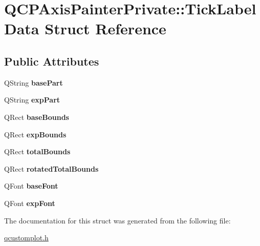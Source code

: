 \hypertarget{structQCPAxisPainterPrivate_1_1TickLabelData}{}\section{Q\+C\+P\+Axis\+Painter\+Private\+:\+:Tick\+Label\+Data Struct Reference}
\label{structQCPAxisPainterPrivate_1_1TickLabelData}
\subsection*{Public Attributes}
\begin{DoxyCompactItemize}
\item 
Q\+String {\bfseries base\+Part}\hypertarget{structQCPAxisPainterPrivate_1_1TickLabelData_ad65b76a5cafc412179a20b5d79809fc4}{}\label{structQCPAxisPainterPrivate_1_1TickLabelData_ad65b76a5cafc412179a20b5d79809fc4}

\item 
Q\+String {\bfseries exp\+Part}\hypertarget{structQCPAxisPainterPrivate_1_1TickLabelData_a09692e4ea092137278b4ac051d5fdf2b}{}\label{structQCPAxisPainterPrivate_1_1TickLabelData_a09692e4ea092137278b4ac051d5fdf2b}

\item 
Q\+Rect {\bfseries base\+Bounds}\hypertarget{structQCPAxisPainterPrivate_1_1TickLabelData_aac1047ae6ab8e9f5a42923082aabfff5}{}\label{structQCPAxisPainterPrivate_1_1TickLabelData_aac1047ae6ab8e9f5a42923082aabfff5}

\item 
Q\+Rect {\bfseries exp\+Bounds}\hypertarget{structQCPAxisPainterPrivate_1_1TickLabelData_a6722d2bcefb93011e9dc42301b966846}{}\label{structQCPAxisPainterPrivate_1_1TickLabelData_a6722d2bcefb93011e9dc42301b966846}

\item 
Q\+Rect {\bfseries total\+Bounds}\hypertarget{structQCPAxisPainterPrivate_1_1TickLabelData_afbb3163cf4c628914f1b703945419ea5}{}\label{structQCPAxisPainterPrivate_1_1TickLabelData_afbb3163cf4c628914f1b703945419ea5}

\item 
Q\+Rect {\bfseries rotated\+Total\+Bounds}\hypertarget{structQCPAxisPainterPrivate_1_1TickLabelData_aa4d38c5ea47c9184a78ee33ae7f1012e}{}\label{structQCPAxisPainterPrivate_1_1TickLabelData_aa4d38c5ea47c9184a78ee33ae7f1012e}

\item 
Q\+Font {\bfseries base\+Font}\hypertarget{structQCPAxisPainterPrivate_1_1TickLabelData_a0d4958a706debaa8d19a9b65fc090d56}{}\label{structQCPAxisPainterPrivate_1_1TickLabelData_a0d4958a706debaa8d19a9b65fc090d56}

\item 
Q\+Font {\bfseries exp\+Font}\hypertarget{structQCPAxisPainterPrivate_1_1TickLabelData_adc10767ebcb719d6927c012a38b9d933}{}\label{structQCPAxisPainterPrivate_1_1TickLabelData_adc10767ebcb719d6927c012a38b9d933}

\end{DoxyCompactItemize}


The documentation for this struct was generated from the following file\+:\begin{DoxyCompactItemize}
\item 
\hyperlink{qcustomplot_8h}{qcustomplot.\+h}\end{DoxyCompactItemize}
